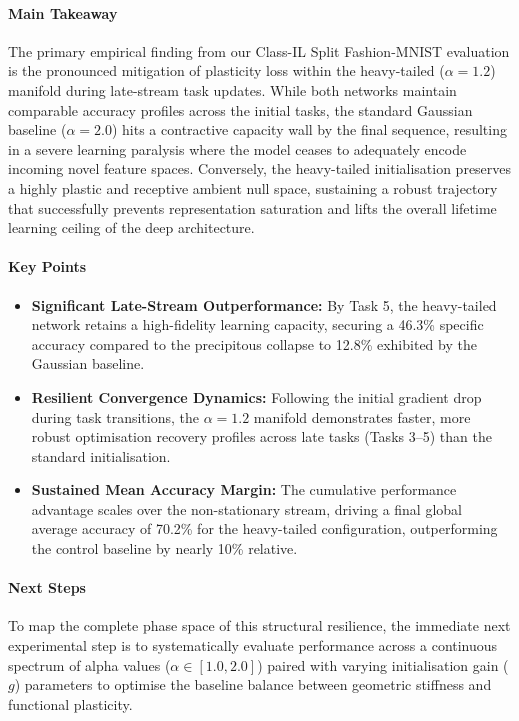 \documentclass[10pt,a4paper]{article}
\begin{document}
	\paragraph{Main Takeaway}
	The primary empirical finding from our Class-IL Split Fashion-MNIST evaluation is the pronounced mitigation of plasticity loss within the heavy-tailed ($\alpha=1.2$) manifold during late-stream task updates. While both networks maintain comparable accuracy profiles across the initial tasks, the standard Gaussian baseline ($\alpha=2.0$) hits a contractive capacity wall by the final sequence, resulting in a severe learning paralysis where the model ceases to adequately encode incoming novel feature spaces. Conversely, the heavy-tailed initialisation preserves a highly plastic and receptive ambient null space, sustaining a robust trajectory that successfully prevents representation saturation and lifts the overall lifetime learning ceiling of the deep architecture.
	
	\paragraph{Key Points}
	\begin{itemize}
		\item \textbf{Significant Late-Stream Outperformance:} By Task 5, the heavy-tailed network retains a high-fidelity learning capacity, securing a 46.3\% specific accuracy compared to the precipitous collapse to 12.8\% exhibited by the Gaussian baseline.
		\item \textbf{Resilient Convergence Dynamics:} Following the initial gradient drop during task transitions, the $\alpha=1.2$ manifold demonstrates faster, more robust optimisation recovery profiles across late tasks (Tasks 3--5) than the standard initialisation.
		\item \textbf{Sustained Mean Accuracy Margin:} The cumulative performance advantage scales over the non-stationary stream, driving a final global average accuracy of 70.2\% for the heavy-tailed configuration, outperforming the control baseline by nearly 10\% relative.
	\end{itemize}
	
	\paragraph{Next Steps}
	To map the complete phase space of this structural resilience, the immediate next experimental step is to systematically evaluate performance across a continuous spectrum of alpha values ($\alpha \in [1.0, 2.0]$) paired with varying initialisation gain ($g$) parameters to optimise the baseline balance between geometric stiffness and functional plasticity.
	
\end{document}
